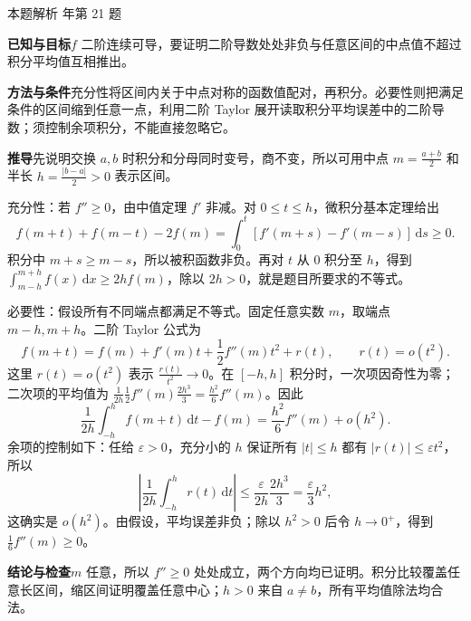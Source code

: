 \documentclass[UTF8,zihao=-4,fontset=fandol]{ctexart}
\newenvironment{QuestionSolution}[1]{%
  \clearpage
  {\small\textcolor{black!60}{本题解析\quad #1}}\par\medskip
}{\par\clearpage}
\begin{document}
\begin{QuestionSolution}{2022 年第 21 题}
\textbf{已知与目标}\quad \(f\) 二阶连续可导，要证明二阶导数处处非负与任意区间的中点值不超过积分平均值互相推出。

\textbf{方法与条件}\quad 充分性将区间内关于中点对称的函数值配对，再积分。必要性则把满足条件的区间缩到任意一点，利用二阶 Taylor 展开读取积分平均误差中的二阶导数；须控制余项积分，不能直接忽略它。

\textbf{推导}\quad 先说明交换 \(a,b\) 时积分和分母同时变号，商不变，所以可用中点 \(m=\frac{a+b}{2}\) 和半长 \(h=\frac{|b-a|}{2}>0\) 表示区间。

充分性：若 \(f''\ge0\)，由中值定理 \(f'\) 非减。对 \(0\le t\le h\)，微积分基本定理给出
\[
f(m+t)+f(m-t)-2f(m)
=\int_0^t[f'(m+s)-f'(m-s)]\,\mathrm{d}s\ge0.
\]
积分中 \(m+s\ge m-s\)，所以被积函数非负。再对 \(t\) 从 \(0\) 积分至 \(h\)，得到 \(\int_{m-h}^{m+h}f(x)\,\mathrm dx\ge2hf(m)\)，除以 \(2h>0\)，就是题目所要求的不等式。

必要性：假设所有不同端点都满足不等式。固定任意实数 \(m\)，取端点 \(m-h,m+h\)。二阶 Taylor 公式为
\[f(m+t)=f(m)+f'(m)t+\frac12f''(m)t^2+r(t),\qquad r(t)=o(t^2).\]
这里 \(r(t)=o(t^2)\) 表示 \(\frac{r(t)}{t^2}\to0\)。在 \([-h,h]\) 积分时，一次项因奇性为零；二次项的平均值为 \(\frac1{2h}\frac12f''(m)\frac{2h^3}{3}=\frac{h^2}{6}f''(m)\)。因此
\[
\frac{1}{2h}\int_{-h}^h f(m+t)\,\mathrm{d}t-f(m)
=\frac{h^2}{6}f''(m)+o(h^2).
\]
余项的控制如下：任给 \(\varepsilon>0\)，充分小的 \(h\) 保证所有 \(|t|\le h\) 都有 \(|r(t)|\le\varepsilon t^2\)，所以
\[\left|\frac1{2h}\int_{-h}^h r(t)\,\mathrm dt\right|\le\frac\varepsilon{2h}\frac{2h^3}{3}=\frac\varepsilon3h^2,\]
这确实是 \(o(h^2)\)。由假设，平均误差非负；除以 \(h^2>0\) 后令 \(h\to0^+\)，得到 \(\frac16f''(m)\ge0\)。

\textbf{结论与检查}\quad \(m\) 任意，所以 \(f''\ge0\) 处处成立，两个方向均已证明。积分比较覆盖任意长区间，缩区间证明覆盖任意中心；\(h>0\) 来自 \(a\ne b\)，所有平均值除法均合法。
\end{QuestionSolution}
\end{document}
